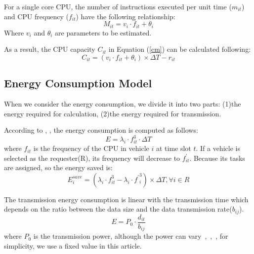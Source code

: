 \documentclass[conference]{IEEEtran}
\begin{document}
For a single core CPU, the number of instructions executed per unit time ($m_{it}$) and CPU frequency ($f_{it}$) have the following relationship:
\begin{equation}
	M_{it} = v_i \cdot f_{it} + \theta_i
	\label{mf}
\end{equation}
Where $v_ {i} $ and $\theta_ i$ are parameters to be estimated. 

As a result, the CPU capacity $C_{it}$ in Equation (\ref{cm}) can be calculated following:
\begin{equation}
	C_{it} = (v_i \cdot f_{it} + \theta_i)   \times \Delta T 
	- r_{it}
	\label{cf}
\end{equation}

\subsection{Energy Consumption Model}
When we consider the energy consumption, we divide it into two parts: (1)the energy required for calculation, (2)the energy required for transmission. 

According to \cite{efv}, \cite{vf}%
, the energy consumption is computed as follows:
\begin{equation}
	E=\lambda_{i} \cdot f_{it}^{3} \cdot \Delta T
	\label{ef}
\end{equation}
where $f_ {it}$ is the frequency of the CPU in vehicle $i$ at time slot $t$. If a vehicle is selected as the requester(R), its frequency will decrease to $f^ \prime _ {it}$. Because its tasks are assigned, so the energy saved  is:
\begin{equation}
	E_{i}^{save}
	=( \lambda_{i} \cdot f_{it}^{3} -
	\lambda_{i} \cdot{f^{\prime}}_{i}^{3} ) \times \Delta T
	, 
	\forall i \in R
\end{equation}

The transmission energy consumption is linear with the transmission time which depends on the ratio between the data size and the data transmission rate($b_{ij}$). 
\begin{equation}
	E = P_0 \cdot \frac{d_{it}}{b_{ij}}
\end{equation} 
where $P_0$ is the transmission power, although the power can vary~\cite{liu2021primal},~\cite{liu2022approximation},~\cite{dai2022note}, for simplicity, we use a fixed value in this article. 
\end{document}
